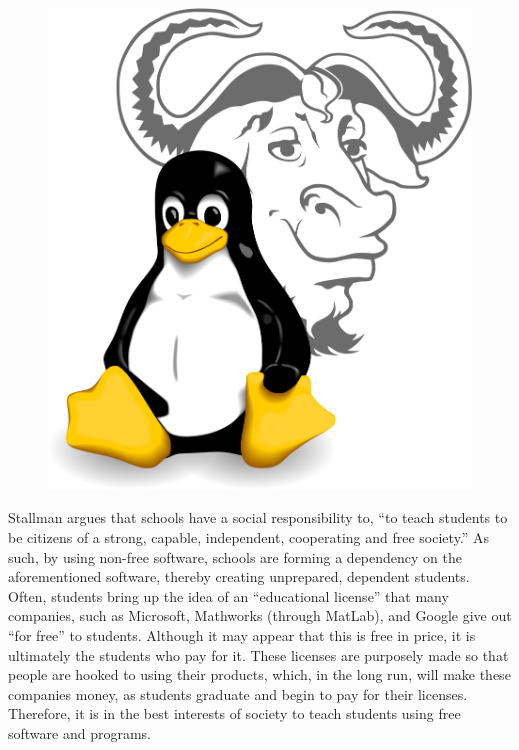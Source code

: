 \documentclass[12pt]{article}
\begin{document}
\begin{multicols}{3}
  \begin{figure}
  \includegraphics[width=\linewidth]{Images/gnulinux.png}
  \end{figure}

  \vfill

  Stallman argues that schools have a social responsibility to, “to teach students to be citizens of a strong, capable, independent, cooperating and free society.” As such, by using non-free software, schools are forming a dependency on the aforementioned software, thereby creating unprepared, dependent students. Often, students bring up the idea of an “educational license” that many companies, such as Microsoft, Mathworks (through MatLab), and Google give out “for free” to students. Although it may appear that this is free in price, it is ultimately the students who pay for it. These licenses are purposely made so that people are hooked to using their products, which, in the long run, will make these companies money, as students graduate and begin to pay for their licenses. Therefore, it is in the best interests of society to teach students using free software and programs. 

 \end{multicols}
\end{document}
